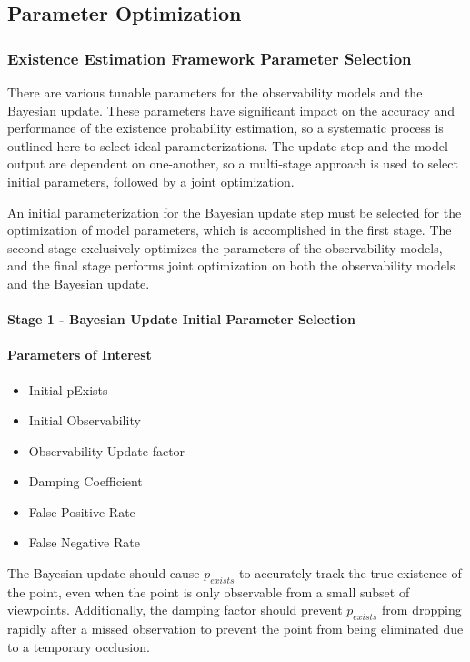 \subsection{Parameter Optimization}

\subsubsection{Existence Estimation Framework Parameter Selection}
There are various tunable parameters for the observability models and the Bayesian update. These parameters have significant impact on the accuracy and performance of the existence probability estimation, so a systematic process is outlined here to select ideal parameterizations. The update step and the model output are dependent on one-another, so a multi-stage approach is used to select initial parameters, followed by a joint optimization.

An initial parameterization for the Bayesian update step must be selected for the optimization of model parameters, which is accomplished in the first stage. The second stage exclusively optimizes the parameters of the observability models, and the final stage performs joint optimization on both the observability models and the Bayesian update.

\paragraph{Stage 1 - Bayesian Update Initial Parameter Selection}

\paragraph{Parameters of Interest}
\begin{itemize}
    \item Initial pExists
    \item Initial Observability
    \item Observability Update factor
    \item Damping Coefficient
    \item False Positive Rate
    \item False Negative Rate
\end{itemize}

The Bayesian update should cause $p_{exists}$ to accurately track the true existence of the point, even when the point is only observable from a small subset of viewpoints. Additionally, the damping factor should prevent $p_{exists}$ from dropping rapidly after a missed observation to prevent the point from being eliminated due to a temporary occlusion.

